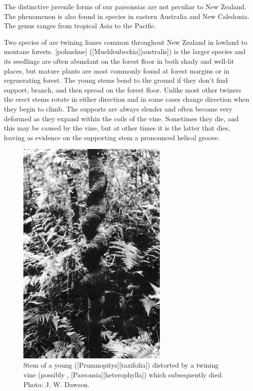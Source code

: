 The distinctive juvenile forms of our parsonsias are not peculiar to New Zealand.
The phenomenon is also found in species in eastern Australia and New Caledonia.
The genus ranges from tropical Asia to the Pacific.

Two species of  are twining lianes common throughout New Zealand in lowland to montane forests.
[pohuehue] ([Muehlenbeckia][australis]) is the larger species and its seedlings are often abundant on the forest floor in both shady and well-lit places, but mature plants are most commonly found at forest margins or in regenerating forest.
The young stems bend to the ground if they don't find support, branch, and then spread on the forest floor.
Unlike most other twiners the erect stems rotate in either direction and in some cases change direction when they begin to climb.
The supports are always slender and often become very deformed as they expand within the coils of the vine.
Sometimes they die, and this may be caused by the vine, but at other times it is the latter that dies, leaving as evidence on the supporting stem a pronounced helical groove.

\begin{figure}
	\includegraphics[width=0.66\textwidth]{graphics/fig_035}
	\centering
	\caption[Stem of a young matai]{Stem of a young  ([Prumnopitys][taxifolia]) distorted by a twining vine (possibly , [Parsonsia][heterophylla]) which subsequently died.
	Photo: J. W. Dawson.}%
	\label{fig:35matai}%
\end{figure}

